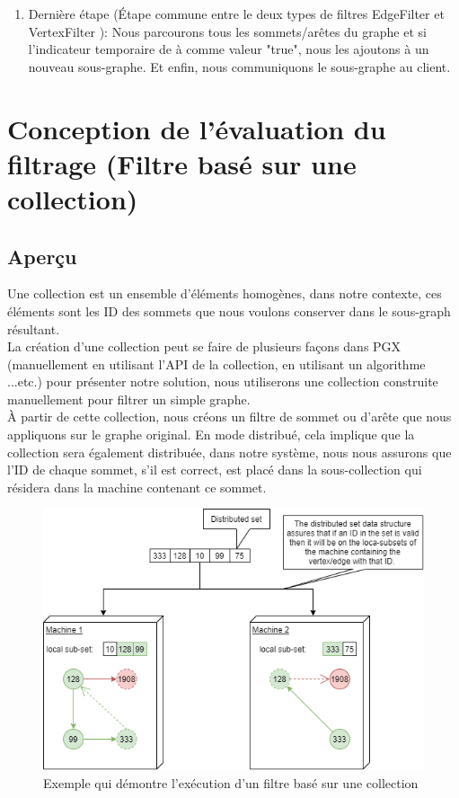\begin{enumerate}[label=\arabic*)]
\item  Dernière étape (Étape commune entre le deux types de filtres EdgeFilter et VertexFilter ):
Nous parcourons tous les sommets/arêtes du graphe et si l'indicateur temporaire de à comme valeur "true", nous les ajoutons à un nouveau sous-graphe. Et enfin, nous communiquons le sous-graphe au client.
\end{enumerate}

\section{Conception de l'évaluation du filtrage (Filtre basé sur une collection)}
\subsection{Aperçu}
Une collection est un ensemble d'éléments homogènes, dans notre contexte, ces éléments sont les ID des sommets que nous voulons conserver dans le sous-graph résultant.\\
La création d'une collection peut se faire de plusieurs façons dans PGX (manuellement en utilisant l'API de la collection, en utilisant un algorithme ...etc.) pour présenter notre solution, nous utiliserons une collection construite manuellement pour filtrer un simple graphe.\\
À partir de cette collection, nous créons un filtre de sommet ou d'arête que nous appliquons sur le graphe original. En mode distribué, cela implique que la collection sera également distribuée, dans notre système, nous nous assurons que l'ID de chaque sommet, s'il est correct, est placé dans la sous-collection qui résidera dans la machine contenant ce sommet.\\

\begin{figure}[H]  
  \centering
    \includegraphics[width=1\textwidth]{chapitre3/Figures/SubgraphFromCollection.png}
  \caption{Exemple qui démontre l'exécution d'un filtre basé sur une collection}
\end{figure}

